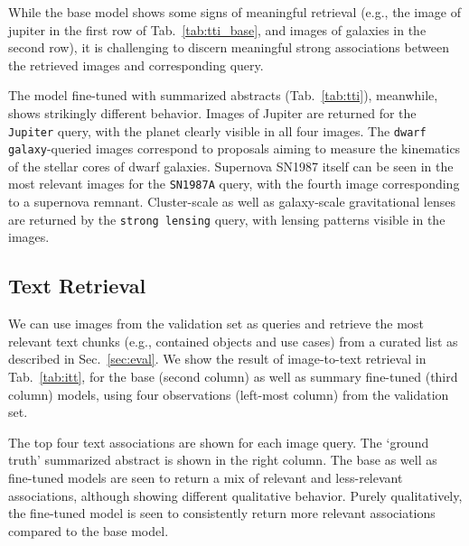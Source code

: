 \documentclass[10pt]{article} %
\begin{document}
While the base model shows some signs of meaningful retrieval (e.g., the image of jupiter in the first row of Tab.~\ref{tab:tti_base}, and images of galaxies in the second row), it is challenging to discern meaningful strong associations between the retrieved images and corresponding query.

The model fine-tuned with summarized abstracts (Tab.~\ref{tab:tti}), meanwhile, shows strikingly different behavior.
%
%
Images of Jupiter are returned for the \texttt{Jupiter} query, with the planet clearly visible in all four images.
%
The \texttt{dwarf galaxy}-queried images correspond to proposals aiming to measure the kinematics of the stellar cores of dwarf galaxies.
%
Supernova SN1987 itself can be seen in the most relevant images for the \texttt{SN1987A} query, with the fourth image corresponding to a supernova remnant.
%
Cluster-scale as well as galaxy-scale gravitational lenses are returned by the \texttt{strong lensing} query, with lensing patterns visible in the images.

\subsection{Text Retrieval}

We can use images from the validation set as queries and retrieve the most relevant text chunks (e.g., contained objects and use cases) from a curated list as described in Sec.~\ref{sec:eval}.
%
We show the result of image-to-text retrieval in Tab.~\ref{tab:itt}, for the base (second column) as well as summary fine-tuned (third column) models, using four observations (left-most column) from the validation set.

The top four text associations are shown for each image query.
%
The `ground truth' summarized abstract is shown in the right column.
% 
The base as well as fine-tuned models are seen to return a mix of relevant and less-relevant associations, although showing different qualitative behavior. Purely qualitatively, the fine-tuned model is seen to consistently return more relevant associations compared to the base model.
%
\end{document}
